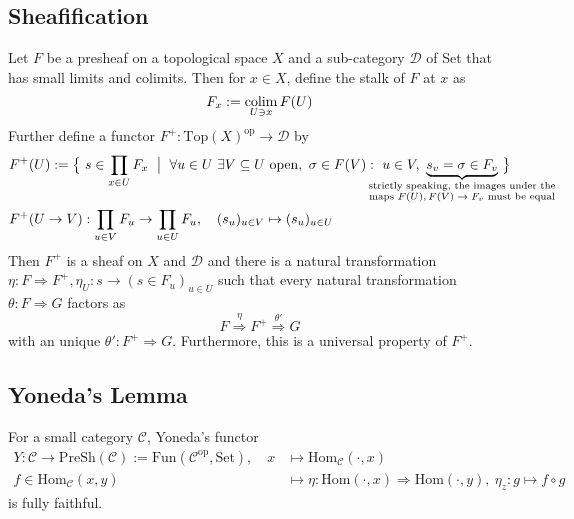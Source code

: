 \subsection{Sheafification}
Let $F$ be a presheaf on a topological space $X$ and a sub-category $\mathcal{D}$ of Set that has small limits and colimits.
Then for $x \in X$, define the stalk of $F$ at $x$ as
\begin{equation*}
    F_x := \operatorname*{colim}_{U \ni x} F(U)
\end{equation*}
Further define a functor $F^+: \mathrm{Top}(X)^{\mathrm{op}} \to \mathcal{D}$ by
\begin{align*}
    &F^+(U) := \bigl\{ \ s \in \prod_{x \in U} F_x \ \bigm| \ \forall u \in U \ \exists V \subseteq U \ \text{open}, \ \sigma \in F(V): \ u \in V, \ \underbrace{s_v = \sigma \in F_v}_{\mathclap{\substack{\text{strictly speaking, the images under the}\\\text{maps $F(U), F(V) \to F_v$ must be equal}}}} \ \bigr\} \\
    &F^+(U \to V): \prod_{u \in V} F_u \to \prod_{u \in U} F_u, \quad (s_u)_{u \in V} \mapsto (s_u)_{u \in U}
\end{align*}
Then $F^+$ is a sheaf on $X$ and $\mathcal{D}$ and there is a natural transformation $\eta: F \Rightarrow F^+, \eta_U: s \to (s \in F_u)_{u \in U}$ such that every natural transformation $\theta: F \Rightarrow G$ factors as
\begin{equation*}
    F \overset{\eta}{\Rightarrow} F^+ \overset{\theta'}{\Rightarrow} G
\end{equation*}
with an unique $\theta': F^+ \Rightarrow G$.
Furthermore, this is a universal property of $F^+$.

\subsection{Yoneda's Lemma}
For a small category $\mathcal{C}$, Yoneda's functor
\begin{align*}
    Y: \mathcal{C} \to \mathrm{PreSh}(\mathcal{C}) := \mathrm{Fun}(\mathcal{C}^{\mathrm{op}}, \mathrm{Set}), \quad x &\mapsto \mathrm{Hom}_{\mathcal{C}}(\cdot, x) \\
    f \in \mathrm{Hom}_{\mathcal{C}}(x, y) &\mapsto \eta: \mathrm{Hom}(\cdot, x) \Rightarrow \mathrm{Hom}(\cdot, y), \ \eta_z: g \mapsto f \circ g
\end{align*}
is fully faithful.

